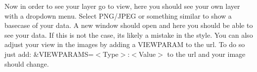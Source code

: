 Now in order to see your layer go to view, here you should see your own layer with a dropdown menu. Select PNG/JPEG or something similar to show a basecase of your data. A new window should open and here you should be able to see your data. If this is not the case, its likely a mistake in the style. You can also adjust your view in the images by adding a VIEWPARAM to the url. To do so just add: \&VIEWPARAMS=$<$Type$>$:$<$Value$>$ to the url and your image should change.